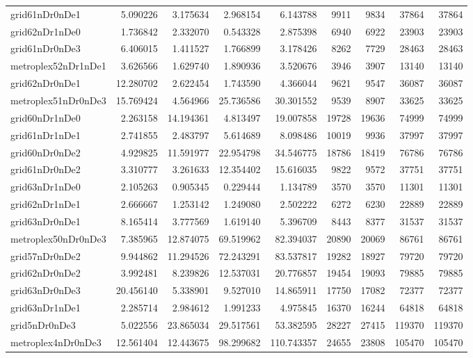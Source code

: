 \begin{longtable}{|l|r|r|r|r|r|r|r|r|}
grid61nDr0nDe1 & 5.090226 & 3.175634 & 2.968154 & 6.143788 & 9911 & 9834 & 37864 & 37864 \\
grid62nDr1nDe0 & 1.736842 & 2.332070 & 0.543328 & 2.875398 & 6940 & 6922 & 23903 & 23903 \\
grid61nDr0nDe3 & 6.406015 & 1.411527 & 1.766899 & 3.178426 & 8262 & 7729 & 28463 & 28463 \\
metroplex52nDr1nDe1 & 3.626566 & 1.629740 & 1.890936 & 3.520676 & 3946 & 3907 & 13140 & 13140 \\
grid62nDr0nDe1 & 12.280702 & 2.622454 & 1.743590 & 4.366044 & 9621 & 9547 & 36087 & 36087 \\
metroplex51nDr0nDe3 & 15.769424 & 4.564966 & 25.736586 & 30.301552 & 9539 & 8907 & 33625 & 33625 \\
grid60nDr1nDe0 & 2.263158 & 14.194361 & 4.813497 & 19.007858 & 19728 & 19636 & 74999 & 74999 \\
grid61nDr1nDe1 & 2.741855 & 2.483797 & 5.614689 & 8.098486 & 10019 & 9936 & 37997 & 37997 \\
grid60nDr0nDe2 & 4.929825 & 11.591977 & 22.954798 & 34.546775 & 18786 & 18419 & 76786 & 76786 \\
grid61nDr0nDe2 & 3.310777 & 3.261633 & 12.354402 & 15.616035 & 9822 & 9572 & 37751 & 37751 \\
grid63nDr1nDe0 & 2.105263 & 0.905345 & 0.229444 & 1.134789 & 3570 & 3570 & 11301 & 11301 \\
grid62nDr1nDe1 & 2.666667 & 1.253142 & 1.249080 & 2.502222 & 6272 & 6230 & 22889 & 22889 \\
grid63nDr0nDe1 & 8.165414 & 3.777569 & 1.619140 & 5.396709 & 8443 & 8377 & 31537 & 31537 \\
metroplex50nDr0nDe3 & 7.385965 & 12.874075 & 69.519962 & 82.394037 & 20890 & 20069 & 86761 & 86761 \\
grid57nDr0nDe2 & 9.944862 & 11.294526 & 72.243291 & 83.537817 & 19282 & 18927 & 79720 & 79720 \\
grid62nDr0nDe2 & 3.992481 & 8.239826 & 12.537031 & 20.776857 & 19454 & 19093 & 79885 & 79885 \\
grid63nDr0nDe3 & 20.456140 & 5.338901 & 9.527010 & 14.865911 & 17750 & 17082 & 72377 & 72377 \\
grid63nDr1nDe1 & 2.285714 & 2.984612 & 1.991233 & 4.975845 & 16370 & 16244 & 64818 & 64818 \\
grid5nDr0nDe3 & 5.022556 & 23.865034 & 29.517561 & 53.382595 & 28227 & 27415 & 119370 & 119370 \\
metroplex4nDr0nDe3 & 12.561404 & 12.443675 & 98.299682 & 110.743357 & 24655 & 23808 & 105470 & 105470 \\

\end{longtable}
